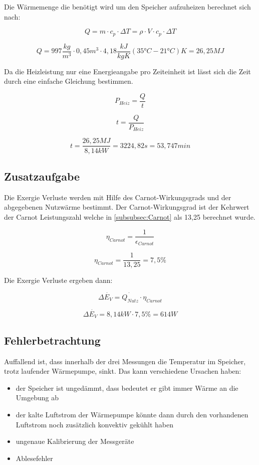 Die Wärmemenge die benötigt wird um den Speicher aufzuheizen berechnet sich nach:

\begin{equation}
Q = m \cdot c_p \cdot \Delta T = \rho \cdot V \cdot c_p \cdot \Delta T
\end{equation}

$$ Q = 997 \frac{kg}{m^3} \cdot 0,45 m^3 \cdot 4,18 \frac{kJ}{kg K} (35 \text{°} C-21 \text{°} C)K=26,25 MJ$$

Da die Heizleistung nur eine Energieangabe pro Zeiteinheit ist lässt sich die Zeit durch eine einfache Gleichung bestimmen.

\begin{equation}
    P_{Heiz}= \frac{Q}{t}
\end{equation}

\begin{equation}
 t = \frac{Q}{P_{Heiz}}
\end{equation}

$$ t= \frac{26,25 MJ}{8,14 kW}=3224,82 s= 53,747 min$$

\subsection{Zusatzaufgabe}

Die Exergie Verluste werden mit Hilfe des Carnot-Wirkungsgrads und der abgegebenen Nutzwärme bestimmt.
Der Carnot-Wirkungsgrad ist der Kehrwert der Carnot Leistungszahl welche in \autoref{subsubsec:Carnot} als 13,25 berechnet wurde.

\begin{equation}
    \eta_{Carnot}=\frac{1}{\epsilon_{Carnot}}
\end{equation}

$$\eta_{Carnot}=\frac{1}{13,25}= 7,5 \%$$

Die Exergie Verluste ergeben dann:

\begin{equation}
   \Delta \dot{E_V}= \dot{Q_{Nutz}} \cdot\eta_{Carnot}
\end{equation}

$$\Delta \dot{E_V}= 8,14kW \cdot 7,5\%= 614W$$


\subsection{Fehlerbetrachtung}
Auffallend ist, dass innerhalb der drei Messungen die Temperatur im Speicher,
trotz laufender Wärmepumpe, sinkt. Das kann verschiedene Ursachen haben:
\begin{itemize}
    \item der Speicher ist ungedämmt, dass bedeutet er gibt immer Wärme an die Umgebung ab
    \item der kalte Luftstrom der Wärmepumpe könnte dann durch den vorhandenen Luftstrom noch zusätzlich konvektiv gekühlt haben 
\item ungenaue Kalibrierung der Messgeräte
\item Ablesefehler
\end{itemize}


